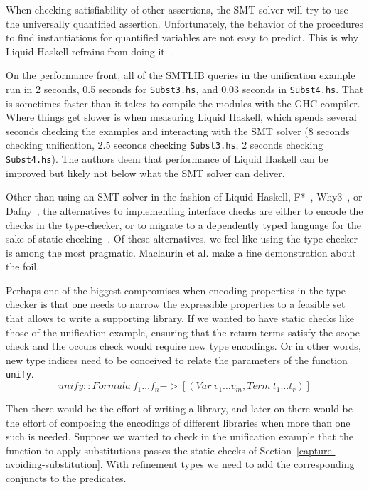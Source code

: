 \documentclass[sigconf, anonymous, review]{acmart}
\newcommand{\tc}[1]{{\small\texttt{#1}}}
\begin{document}
When checking satisfiability of other assertions, the SMT solver
will try to use the universally quantified assertion. Unfortunately, the
behavior of the procedures to find instantiations for quantified variables are
not easy to predict. This is why Liquid Haskell refrains from doing it~\cite{vazou13}.

On the performance front, all of the SMTLIB queries in the unification example run
in 2 seconds, 0.5 seconds for \tc{Subst3.hs}, and 0.03 seconds in \tc{Subst4.hs}.
That is sometimes faster than it takes to compile the modules with the GHC compiler.
Where things get slower is when measuring Liquid
Haskell, which spends several seconds checking the examples and interacting with the
SMT solver (8 seconds checking unification, 2.5 seconds checking \tc{Subst3.hs},
2 seconds checking \tc{Subst4.hs}). The authors deem that performance of Liquid Haskell
can be improved but likely not below what the SMT solver can deliver.

Other than using an SMT solver in the fashion of Liquid Haskell, F*~\cite{swamy16},
Why3~\cite{filli13}, or Dafny~\cite{leino17},
the alternatives to implementing interface checks are either to encode the checks in
the type-checker, or to migrate to a dependently typed language for the sake of
static checking~\cite{haftmann10, breitner18, carr22}. Of these alternatives,
we feel like using the type-checker is among the most pragmatic. Maclaurin et al. make
a fine demonstration about the foil.

Perhaps one of the biggest compromises when encoding properties in the type-checker
is that one needs to narrow the expressible properties to a feasible set that allows
to write a supporting library. If we wanted to have static checks like those of the
unification example, ensuring that the return terms satisfy the scope check and the
occurs check would require new type encodings. Or in other words, new type indices
need to be conceived to relate the parameters of the function \tc{unify}.
$$\mathit{unify} :: \mathit{Formula}\ f_1 \ldots f_n -> [(\mathit{Var}\ v_1 \ldots v_m, \mathit{Term}\ t_1 \ldots t_r)]$$

Then there would be the effort of writing a library, and later on there would be the
effort of composing the encodings of different libraries when more than one such
is needed. Suppose we wanted to check in the unification example that the
function to apply substitutions passes the static checks of
Section~\ref{capture-avoiding-substitution}. With
refinement types we need to add the corresponding conjuncts to the predicates.
\end{document}
